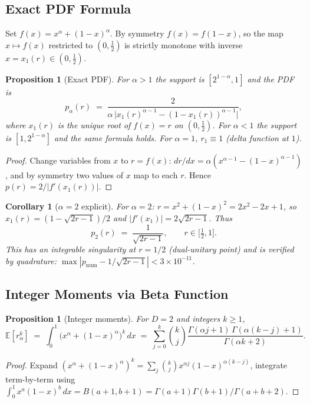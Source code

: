 \documentclass[12pt,a4paper]{article}
\newtheorem{proposition}[theorem]{Proposition}
\newtheorem{corollary}[theorem]{Corollary}
\begin{document}
\subsection{Exact PDF Formula}
\label{subsec:pdf}

Set $f(x)=x^\alpha+(1-x)^\alpha$.  By symmetry $f(x)=f(1-x)$, so the map
$x\mapsto f(x)$ restricted to $(0,\tfrac{1}{2})$ is strictly monotone with inverse
$x=x_1(r)\in(0,\tfrac{1}{2})$.

\begin{proposition}[Exact PDF]\label{prop:pdf_exact}
For $\alpha>1$ the support is $[2^{1-\alpha},1]$ and the PDF is
\[
  p_\alpha(r)\;=\;\frac{2}{\alpha\,\bigl|x_1(r)^{\alpha-1}-(1-x_1(r))^{\alpha-1}\bigr|},
\]
where $x_1(r)$ is the unique root of $f(x)=r$ on $(0,\tfrac{1}{2})$.
For $\alpha<1$ the support is $[1,2^{1-\alpha}]$ and the same formula holds.
For $\alpha=1$, $r_1\equiv1$ (delta function at $1$).
\end{proposition}

\begin{proof}
Change variables from $x$ to $r=f(x)$: $dr/dx=\alpha(x^{\alpha-1}-(1-x)^{\alpha-1})$,
and by symmetry two values of $x$ map to each $r$.  Hence $p(r)=2/|f'(x_1(r))|$.
\end{proof}

\begin{corollary}[$\alpha=2$ explicit]\label{cor:pdf_alpha2}
For $\alpha=2$: $r=x^2+(1-x)^2=2x^2-2x+1$, so $x_1(r)=(1-\sqrt{2r-1})/2$ and
$|f'(x_1)|=2\sqrt{2r-1}$.  Thus
\[
  \boxed{p_2(r)\;=\;\frac{1}{\sqrt{2r-1}},\qquad r\in\bigl[\tfrac{1}{2},1\bigr].}
\]
This has an integrable singularity at $r=1/2$ (dual-unitary point)
and is verified by quadrature: $\max|p_\mathrm{num}-1/\sqrt{2r-1}|<3\times10^{-11}$.
\end{corollary}

\subsection{Integer Moments via Beta Function}
\label{subsec:moments}

\begin{proposition}[Integer moments]\label{prop:moments_beta}
For $D=2$ and integers $k\geq1$,
\[
  \mathbb{E}[r_\alpha^k]
  \;=\;\int_0^1\bigl(x^\alpha+(1-x)^\alpha\bigr)^k\,dx
  \;=\;\sum_{j=0}^{k}\binom{k}{j}
        \frac{\Gamma(\alpha j+1)\,\Gamma(\alpha(k-j)+1)}{\Gamma(\alpha k+2)}.
\]
\end{proposition}

\begin{proof}
Expand $(x^\alpha+(1-x)^\alpha)^k=\sum_j\binom{k}{j}x^{\alpha j}(1-x)^{\alpha(k-j)}$,
integrate term-by-term using $\int_0^1 x^a(1-x)^b\,dx=B(a+1,b+1)=
\Gamma(a+1)\Gamma(b+1)/\Gamma(a+b+2)$.
\end{proof}
\end{document}
